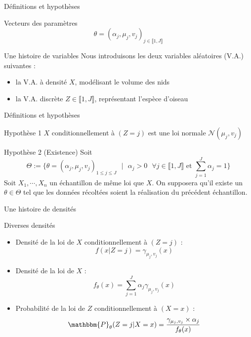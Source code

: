 \documentclass[11pt]{beamer}
\begin{document}
	\begin{frame}{Définitions et hypothèses}
		\begin{block}{Vecteurs des paramètres}
			\[
			\theta = (\alpha_j, \mu_j, v_j)_{j \in \llbracket 1,J\rrbracket}
			\]
		\end{block}
		
		\begin{block}{Une histoire de variables}
			Nous introduisons les deux variables aléatoires (V.A.) suivantes :
			\begin{itemize}
				\item la V.A. à densité $X$, modélisant le volume des nids
				\item la V.A. discrète $Z \in \llbracket 1,J\rrbracket$, représentant l'espèce d'oiseau
			\end{itemize}
		\end{block}


	\end{frame}


	\begin{frame}{Définitions et hypothèses}
		\begin{block}{Hypothèse 1}
			$X$ conditionnellement à $(Z = j)$ est une loi normale $\mathcal{N}(\mu_j, v_j)$
		\end{block}
		\begin{block}{Hypothèse 2 (Existence)}
			Soit \[
			\Theta := \{ \theta = (\alpha_j,\mu_j, v_j)_{1 \leq j \leq J} \text{ } \big| \text{ } \alpha_j > 0 \text{ } \forall j\in \llbracket 1,J\rrbracket \text{ et } \displaystyle\sum_{j=1}^J\alpha_j=1\}
				 \]
Soit $X_1, \cdots, X_n$ un échantillon de même loi que $X$. \newline
On supposera qu'il existe un $\theta \in \Theta$ tel que les données récoltées soient la réalisation du précédent échantillon.
		\end{block}
	\end{frame}

	\begin{frame}{Une histoire de densités}
		\begin{block}{Diverses densités}
			\scriptsize
			\begin{itemize}
				\item Densité de la loi de $X$ conditionnellement à $(Z=j)$ :
				\[
				f(x| Z = j)  = \gamma_{\mu_j, v_j}(x)
				\]
				\item Densité de la loi de $X$ :
					\[
					f_\theta(x) = \displaystyle\sum_{j=1}^J \alpha_j \gamma_{\mu_j, v_j}(x)
					\]
				\item Probabilité de la loi de $Z$ conditionnellement à $(X = x)$ : 
					\[
					\mathbbm{P}_\theta(Z = j | X = x)=\displaystyle \frac{\gamma_{\mu_j, v_j}\times\alpha_j}{f_\theta(x)}
					\]
			\end{itemize}
		\end{block}
	\end{frame}
\end{document}
